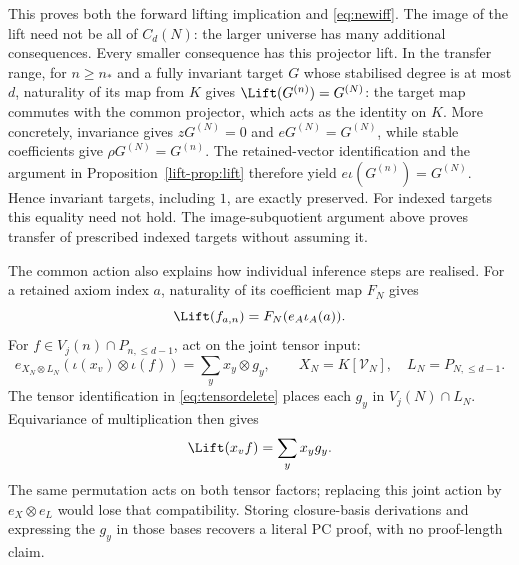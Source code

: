 This proves both the forward lifting implication and
\eqref{eq:newiff}. The image of the lift need not be all of $C_d(N)$:
the larger universe has many additional consequences. Every smaller consequence has this projector lift. In the transfer range, for $n\ge n_*$ and a fully
invariant target $G$ whose stabilised degree is at most $d$, naturality of its map from $K$ gives
$\Lift(G^{(n)})=G^{(N)}$: the target map commutes with the common projector,
which acts as the identity on $K$. More concretely, invariance gives
$zG^{(N)}=0$ and $eG^{(N)}=G^{(N)}$, while stable coefficients give
$\rho G^{(N)}=G^{(n)}$. The retained-vector identification and the argument
in Proposition~\ref{lift-prop:lift} therefore yield $e\iota(G^{(n)})=G^{(N)}$. Hence invariant targets, including
$1$, are exactly preserved. For indexed targets this equality need
not hold. The image-subquotient argument above proves transfer of
prescribed indexed targets without assuming it.

The common action also explains how individual inference steps are
realised. For a retained axiom index $a$, naturality of its coefficient
map $F_N$ gives
\begin{equation}\label{lift-eq:axiomlift}
                 \Lift(f_{a,n})=F_N(e_A\iota_A(a)).
\end{equation}
For $f\in V_j(n)\cap P_{n,\le d-1}$, act on the joint tensor input:
\begin{equation}\label{lift-eq:jointlift}
 e_{X_N\otimes L_N}(\iota(x_v)\otimes\iota(f))
       =\sum_y x_y\otimes g_y,
 \qquad X_N=K[\mathcal V_N],\quad L_N=P_{N,\le d-1}.
\end{equation}
The tensor identification in \eqref{eq:tensordelete} places each
$g_y$ in $V_j(N)\cap L_N$. Equivariance of multiplication then gives
\begin{equation}\label{lift-eq:liftmul}
                         \Lift(x_vf)=\sum_y x_yg_y.
\end{equation}
The same permutation acts on both tensor factors; replacing this joint
action by $e_X\otimes e_L$ would lose that compatibility. Storing
closure-basis derivations and expressing the $g_y$ in those bases
recovers a literal PC proof, with no proof-length claim.

